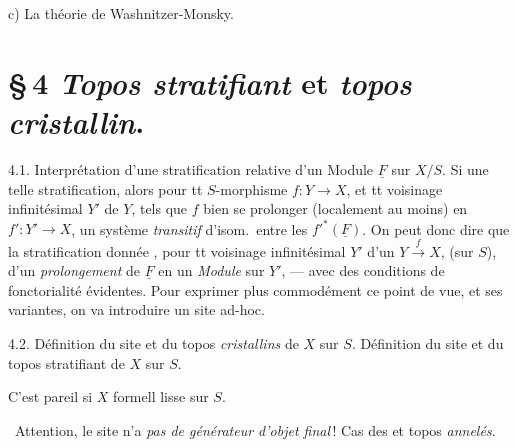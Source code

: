 \documentclass[11pt,a4paper]{article}
\begin{document}
c) La théorie de Washnitzer-Monsky.


\section*{§\,4 \emph{Topos stratifiant} et \emph{topos cristallin}.}

4.1. Interprétation d'une stratification relative d'un Module
$\underline{F}$ sur $X/S$. Si \ill{} \ill{} une telle stratification,
alors pour tt $S$-morphisme $f : Y \to X$, et tt voisinage
infinitésimal $Y'$ de $Y$, 
 tels que $f$  bien se
prolonger (localement au moins) en $f' : Y' \to X$, un système
\emph{transitif} d'isom.\ entre les $f'^{*}(\underline{F})$. On peut donc
dire que la \struck{\ill{}}  stratification 
\struck{\ill{}} donnée \struck{\ill{}}, pour tt voisinage infinitésimal
$Y'$ d'un $Y \xrightarrow{f} X$, (sur $S$),  d'un
\emph{prolongement} \struck{\ill{}} de $\underline{F}$ en un
\emph{Module} sur $Y'$, --- avec des conditions de fonctorialité
évidentes. Pour exprimer plus commodément ce point de vue, et ses
variantes, on va introduire un site ad-hoc.




4.2. Définition du site et du topos \emph{cristallins} de $X$ sur $S$.
Définition du site et du topos stratifiant de $X$ sur $S$.

C'est pareil si $X$ formell lisse sur $S$.

 \ Attention, le site n'a \emph{pas de
générateur d'objet final}\,! Cas des
\struck{\ill{}} et topos \emph{annelés}.
\end{document}
